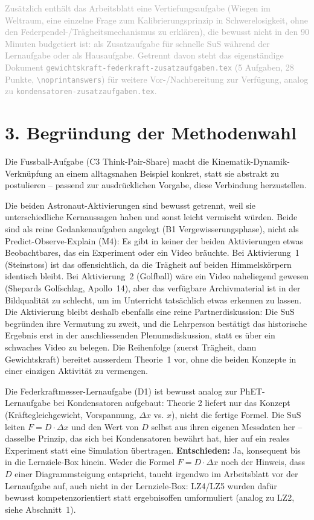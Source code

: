\documentclass[11pt,a4paper]{article}
\begin{document}
\textcolor{darkgray}{\small Zusätzlich enthält das Arbeitsblatt eine
Vertiefungsaufgabe (\glqq Wiegen im Weltraum\grqq{}, eine einzelne Frage
zum Kalibrierungsprinzip in Schwerelosigkeit, ohne den
Federpendel-/Trägheitsmechanismus zu erklären), die bewusst nicht in den 90
Minuten budgetiert ist: als Zusatzaufgabe für schnelle SuS während der
Lernaufgabe oder als Hausaufgabe. Getrennt davon steht das eigenständige
Dokument \texttt{gewichtskraft-federkraft-zusatzaufgaben.tex} (5 Aufgaben,
28 Punkte, \texttt{\textbackslash noprintanswers}) für weitere
Vor-/Nachbereitung zur Verfügung, analog zu
\texttt{kondensatoren-zusatzaufgaben.tex}.}

\section*{3. Begründung der Methodenwahl}

Die Fussball-Aufgabe (C3 Think-Pair-Share) macht die Kinematik-Dynamik-
Verknüpfung an einem alltagsnahen Beispiel konkret, statt sie abstrakt zu
postulieren -- passend zur ausdrücklichen Vorgabe, diese Verbindung
herzustellen.

Die beiden Astronaut-Aktivierungen sind bewusst getrennt, weil sie
unterschiedliche Kernaussagen haben und sonst leicht vermischt würden.
Beide sind als reine Gedankenaufgaben angelegt (B1 Vergewisserungsphase),
nicht als Predict-Observe-Explain (M4): Es gibt in keiner der beiden
Aktivierungen etwas Beobachtbares, das ein Experiment oder ein Video
bräuchte. Bei Aktivierung~1 (Steinstoss) ist das offensichtlich, da die
Trägheit auf beiden Himmelskörpern identisch bleibt. Bei Aktivierung~2
(Golfball) wäre ein Video naheliegend gewesen (Shepards Golfschlag,
Apollo~14), aber das verfügbare Archivmaterial ist in der Bildqualität zu
schlecht, um im Unterricht tatsächlich etwas erkennen zu lassen. Die
Aktivierung bleibt deshalb ebenfalls eine reine Partnerdiskussion: Die SuS
begründen ihre Vermutung zu zweit, und die Lehrperson bestätigt das
historische Ergebnis erst in der anschliessenden Plenumsdiskussion, statt
es über ein schwaches Video zu belegen. Die Reihenfolge (zuerst Trägheit,
dann Gewichtskraft) bereitet ausserdem Theorie~1 vor, ohne die beiden
Konzepte in einer einzigen Aktivität zu vermengen.

Die Federkraftmesser-Lernaufgabe (D1) ist bewusst analog zur PhET-Lernaufgabe
bei Kondensatoren aufgebaut: Theorie 2 liefert nur das Konzept
(Kräftegleichgewicht, Vorspannung, $\Delta x$ vs. $x$), nicht die fertige
Formel. Die SuS leiten $F=D\cdot\Delta x$ und den Wert von $D$ selbst aus
ihren eigenen Messdaten her -- dasselbe Prinzip, das sich bei Kondensatoren
bewährt hat, hier auf ein reales Experiment statt eine Simulation
übertragen. \textbf{Entschieden:} Ja, konsequent bis in die Lernziele-Box
hinein. Weder die Formel $F=D\cdot\Delta x$ noch der Hinweis, dass $D$
einer Diagrammsteigung entspricht, taucht irgendwo im Arbeitsblatt vor der
Lernaufgabe auf, auch nicht in der Lernziele-Box: LZ4/LZ5 wurden dafür
bewusst kompetenzorientiert statt ergebnisoffen umformuliert (analog zu
LZ2, siehe Abschnitt~1).
\end{document}

